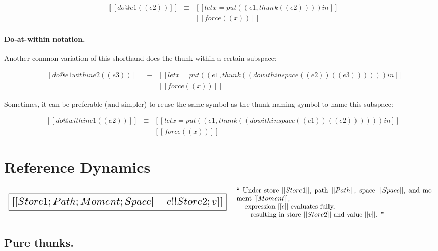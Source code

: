 \documentclass[11pt]{article}
\begin{document}
\[
\begin{array}{lcl}
  [[do @e1 ({( e2 )}) ]]
  &\equiv&
  [[let x = put((e1, thunk((e2)))) in]]
  \\
  &&[[force((x))]]
\end{array}
\]

\paragraph{Do-at-within notation.}
Another common variation of this shorthand does the thunk within a
certain subspace:

\[
\begin{array}{lcl}
  [[do @e1 within e2 ({( e3 )})]]
  &\equiv&
  [[let x = put((e1, thunk((do within space ((e2))({(e3)}) )))) in]]
  \\
  &&[[force((x))]]
\end{array}
\]

\noindent
Sometimes, it can be preferable (and simpler) to reuse the same symbol
as the thunk-naming symbol to name this subspace:

\[
\begin{array}{lcl}
  [[do @within e1 ({( e2 )})]]
  &\equiv&
  [[let x = put((e1, thunk((do within space ((e1))({(e2)}))))) in]]
  \\
  &&[[force((x))]]
\end{array}
\]

\section{Reference Dynamics}
\label{sec:reference-dynamics}

\[
\begin{array}{lc}
\scalebox{1.5}{\boxed{
  [[Store1; Path; Moment; Space |- e !! Store2; v]]
}}
&
\begin{array}{p{4in}}
  ``
  Under store~$[[Store1]]$,
  path~$[[Path]]$,
  space~$[[Space]]$,
  and
  moment~$[[Moment]]$,\\
  \hspace{3mm}~expression~$[[e]]$ evaluates fully,\\
  \hspace{6mm}~resulting in store~$[[Store2]]$ and value~$[[v]]$.
  ''
\end{array}
\end{array}
\]


\subsection{Pure thunks.}
\end{document}
